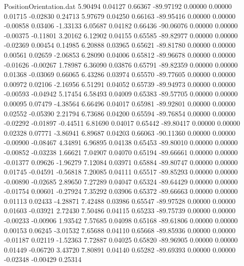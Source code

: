 \begin{filecontents}{PositionOrientation.dat}
   5.90494    0.04127    0.66367   -89.97192    0.00000    0.00000    0.01715   -0.02830    0.24713
   5.97679    0.04250    0.66163   -89.95416    0.00000    0.00000   -0.00858    0.03406   -1.33133
   6.05687    0.04182    0.66436   -90.06076    0.00000    0.00000   -0.00375   -0.11801    3.20162
   6.12902    0.04155    0.65585   -89.82977    0.00000    0.00000   -0.02369    0.00454    0.14985
   6.20888    0.03965    0.65621   -89.81780    0.00000    0.00000    0.00561    0.02659   -2.06853
   6.28090    0.04006    0.65812   -89.96678    0.00000    0.00000   -0.01626   -0.00267    1.78987
   6.36090    0.03876    0.65791   -89.82359    0.00000    0.00000    0.01368   -0.03069    0.66065
   6.43286    0.03974    0.65570   -89.77605    0.00000    0.00000    0.00972    0.02106   -2.16956
   6.51291    0.04052    0.65739   -89.94973    0.00000    0.00000   -0.00593   -0.04942    5.17454
   6.58493    0.04009    0.65383   -89.57705    0.00000    0.00000    0.00095    0.07479   -4.38564
   6.66496    0.04017    0.65981   -89.92801    0.00000    0.00000    0.02552   -0.05390    2.21794
   6.73686    0.04200    0.65594   -89.76854    0.00000    0.00000   -0.02292   -0.01897   -0.44511
   6.81690    0.04017    0.65442   -89.80417    0.00000    0.00000    0.02328    0.07771   -3.86941
   6.89687    0.04203    0.66063   -90.11360    0.00000    0.00000   -0.00900   -0.08467    4.34891
   6.96895    0.04138    0.65453   -89.80010    0.00000    0.00000   -0.00852   -0.03238    1.66621
   7.04907    0.04070    0.65194   -89.66661    0.00000    0.00000   -0.01377    0.09626   -1.96279
   7.12084    0.03971    0.65884   -89.80747    0.00000    0.00000    0.01745   -0.04591   -0.56818
   7.20085    0.04111    0.65517   -89.85293    0.00000    0.00000   -0.00890   -0.02685    2.89650
   7.27289    0.04047    0.65324   -89.64429    0.00000    0.00000   -0.01754    0.00601   -0.27924
   7.35292    0.03906    0.65372   -89.66663    0.00000    0.00000    0.01113    0.02433   -4.28871
   7.42488    0.03986    0.65547   -89.97528    0.00000    0.00000    0.01603   -0.03921    2.72430
   7.50486    0.04115    0.65233   -89.75739    0.00000    0.00000   -0.00233   -0.00906    1.93542
   7.57685    0.04098    0.65168   -89.61806    0.00000    0.00000    0.00153    0.06245   -3.01532
   7.65688    0.04110    0.65668   -89.85936    0.00000    0.00000   -0.01187    0.02119   -1.52363
   7.72887    0.04025    0.65820   -89.96905    0.00000    0.00000    0.01449   -0.06720    3.43720
   7.80891    0.04140    0.65282   -89.69393    0.00000    0.00000   -0.02348   -0.00429    0.25314

\end{filecontents}
